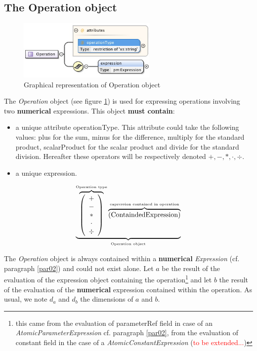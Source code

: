 \documentclass[a4paper,11pt] {ivoa}
\begin{document}
\subsection{The Operation object}\label{par02_02}
\begin{figure}[htbp]
\begin{center}
\includegraphics[width=0.6\textwidth]{pictures/Operation.jpg} 
\caption{Graphical representation of Operation object}
\label{Pic-Operation}
\end{center}
\end{figure}

The {\it Operation} object (see figure \ref{Pic-Operation}) is used for expressing operations
involving two {\bf numerical} expressions. This object {\bf must contain}:
\begin{itemize}
\item a unique attribute operationType. This attribute could take the following values: plus for the
sum, minus for the difference, multiply for the standard product, scalarProduct for the scalar
product and divide for the standard division. Hereafter these operators will be respectively denoted
$+,-,\ast,\cdot, \div$.
\item a unique expression.
\end{itemize}
\begin{equation}\label{OperationEquation}
\underbrace{ \overbrace{\left( \begin{array}{c} + \\ - \\ \ast  \\ \cdot \\ \div   \end{array} \right) }^{\mbox{\tiny Operation type}}
 \overbrace{    \left( \mbox{ContaindedExpression}\right) }^{\mbox{\tiny expression contained in operation}}   }_{\mbox{\tiny Operation object}}
\end{equation}

The {\it Operation} object is always contained within a {\bf numerical} {\it Expression} (cf.
paragraph \ref{par02}) and could not exist alone.
Let $a$ be the result of the evaluation of the expression object containing the
operation\footnote{this came from the evaluation of parameterRef field in case of an {\it
AtomicParameterExpression} cf. paragraph \ref{par02}, from the evaluation of constant field in the
case of a {\it AtomicConstantExpression} (\textcolor{red}{to be extended...})} and let $b$ the
result of the evaluation of the {\bf numerical} expression contained within the operation. As usual,
we note $d_a$ and $d_b$ the dimensions of $a$ and $b$.\\
\end{document}
